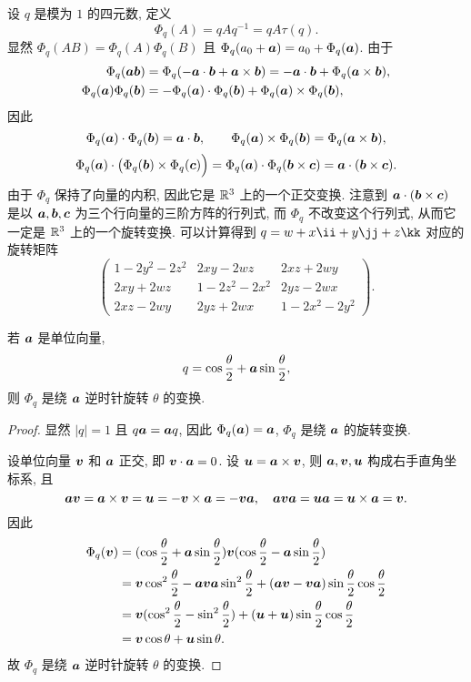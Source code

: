 设 $q$ 是模为 $1$ 的四元数, 定义
\begin{equation}
  \label{eq:rotation-quaternion}
  \Phi_q(A)=qAq^{-1}=qA\tau(q).
\end{equation}
显然 $\Phi_q(AB)=\Phi_q(A)\Phi_q(B)$ 且 $\Phi_q(a_0+\bfa)=a_0+\Phi_q(\bfa)$.
由于
\begin{align*}
   \Phi_q(\bfa\bfb)&
   =\Phi_q(-\bfa\cdot\bfb+\bfa\times\bfb)
   =-\bfa\cdot\bfb+\Phi_q(\bfa\times\bfb),\\
   \Phi_q(\bfa)\Phi_q(\bfb)&
  =-\Phi_q(\bfa)\cdot\Phi_q(\bfb)
    +\Phi_q(\bfa)\times\Phi_q(\bfb),
\end{align*}
因此
\[
   \Phi_q(\bfa)\cdot\Phi_q(\bfb)
  =\bfa\cdot\bfb,\qquad
   \Phi_q(\bfa)\times\Phi_q(\bfb)
  =\Phi_q(\bfa\times\bfb),
\]
\[
  \Phi_q(\bfa)\cdot\bigl(\Phi_q(\bfb)\times\Phi_q(\bfc)\Bigr)
  =\Phi_q(\bfa)\cdot\Phi_q(\bfb\times\bfc)
  =\bfa\cdot(\bfb\times\bfc).
\]
由于 $\Phi_q$ 保持了向量的内积, 因此它是 $\BR^3$ 上的一个正交变换.
注意到 $\bfa\cdot(\bfb\times\bfc)$ 是以 $\bfa,\bfb,\bfc$ 为三个行向量的三阶方阵的行列式, 而 $\Phi_q$ 不改变这个行列式, 从而它一定是 $\BR^3$ 上的一个旋转变换.
可以计算得到 $q=w+x\ii+y\jj+z\kk$ 对应的旋转矩阵
\[
 \begin{pmatrix}
   1-2y^2-2z^2&2xy-2wz&2xz+2wy\\
   2xy+2wz&1-2z^2-2x^2&2yz-2wx\\
   2xz-2wy&2yz+2wx&1-2x^2-2y^2
 \end{pmatrix}.
\]

\begin{theorem}
  若 $\bfa$ 是单位向量,
  \[
    q=\cos\frac\theta2+\bfa\sin\frac\theta2,
  \]
  则 $\Phi_q$ 是绕 $\bfa$ 逆时针旋转 $\theta$ 的变换.
\end{theorem}

\begin{proof}
  显然 $|q|=1$ 且 $q\bfa=\bfa q$, 因此 $\Phi_q(\bfa)=\bfa$, $\Phi_q$ 是绕 $\bfa$ 的旋转变换.

  设单位向量 $\bfv$ 和 $\bfa$ 正交, 即 $\bfv\cdot \bfa=0$.
  设 $\bfu=\bfa\times\bfv$, 则 $\bfa,\bfv,\bfu$ 构成右手直角坐标系, 且
  \[
    \bfa\bfv=\bfa\times\bfv=\bfu=-\bfv\times\bfa=-\bfv\bfa,\quad
    \bfa\bfv\bfa=\bfu\bfa=\bfu\times\bfa=\bfv.
  \]
  因此
  \begin{align*}
    \Phi_q(\bfv)&
    =(\cos\frac\theta2+\bfa\sin\frac\theta2)\bfv 
      (\cos\frac\theta2-\bfa\sin\frac\theta2)\\&
    =\bfv\cos^2\frac\theta2-\bfa\bfv\bfa\sin^2\frac\theta2
      +(\bfa\bfv-\bfv\bfa)\sin\frac\theta2\cos\frac\theta2\\&
    =\bfv(\cos^2\frac\theta2-\sin^2\frac\theta2)
      +(\bfu+\bfu)\sin\frac\theta2\cos\frac\theta2\\&
    =\bfv\cos\theta+\bfu\sin\theta.
  \end{align*}
  故 $\Phi_q$ 是绕 $\bfa$ 逆时针旋转 $\theta$ 的变换.
\end{proof}

